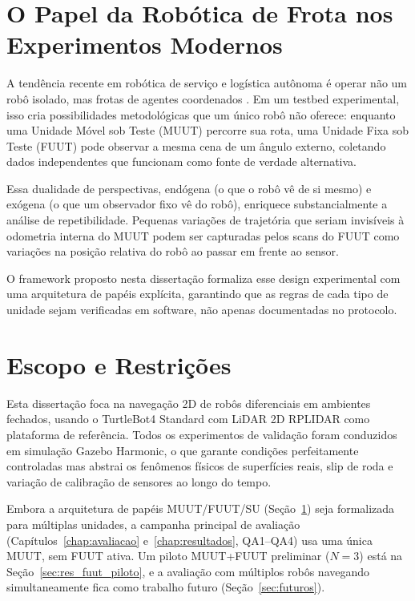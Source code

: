 \section{O Papel da Robótica de Frota nos Experimentos Modernos}
\label{sec:frota}

A tendência recente em robótica de serviço e logística autônoma é operar não um
robô isolado, mas frotas de agentes coordenados \cite{macenski2022ros2,verma2021}. Em um
testbed experimental, isso cria possibilidades metodológicas que um único robô
não oferece: enquanto uma Unidade Móvel sob Teste (MUUT) percorre sua rota, uma
Unidade Fixa sob Teste (FUUT) pode observar a mesma cena de um ângulo externo,
coletando dados independentes que funcionam como fonte de verdade alternativa.

Essa dualidade de perspectivas, endógena (o que o robô vê de si mesmo) e exógena
(o que um observador fixo vê do robô), enriquece substancialmente a análise de
repetibilidade. Pequenas variações de trajetória que seriam invisíveis à odometria
interna do MUUT podem ser capturadas pelos scans do FUUT como variações na posição
relativa do robô ao passar em frente ao sensor.

O framework proposto nesta dissertação formaliza esse design experimental com uma
arquitetura de papéis explícita, garantindo que as regras de cada tipo de unidade
sejam verificadas em software, não apenas documentadas no protocolo.

\section{Escopo e Restrições}
\label{sec:escopo}

Esta dissertação foca na navegação 2D de robôs diferenciais em ambientes fechados,
usando o TurtleBot4 Standard com LiDAR 2D RPLIDAR como plataforma de referência. Todos
os experimentos de validação foram conduzidos em simulação Gazebo Harmonic, o que
garante condições perfeitamente controladas mas abstrai os fenômenos físicos de
superfícies reais, slip de roda e variação de calibração de sensores ao longo do
tempo.

Embora a arquitetura de papéis MUUT/FUUT/SU (Seção~\ref{sec:frota}) seja
formalizada para múltiplas unidades, a campanha principal de avaliação
(Capítulos~\ref{chap:avaliacao} e~\ref{chap:resultados}, QA1--QA4) usa uma
única MUUT, sem FUUT ativa. Um piloto MUUT+FUUT preliminar ($N=3$) está na
Seção~\ref{sec:res_fuut_piloto}, e a avaliação com múltiplos robôs
navegando simultaneamente fica como trabalho futuro
(Seção~\ref{sec:futuros}).

